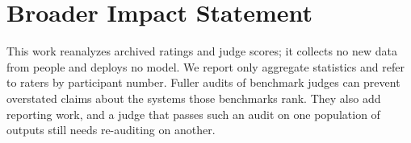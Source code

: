 \section*{Broader Impact Statement}
This work reanalyzes archived ratings and judge scores; it collects no new data from people and deploys no model.
We report only aggregate statistics and refer to raters by participant number.
Fuller audits of benchmark judges can prevent overstated claims about the systems those benchmarks rank.
They also add reporting work, and a judge that passes such an audit on one population of outputs still needs re-auditing on another.
